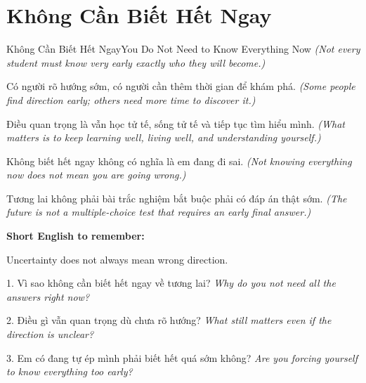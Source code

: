\section{Không Cần Biết Hết Ngay}
\begin{truyen}{Không Cần Biết Hết Ngay}{You Do Not Need to Know Everything Now}
\textit{(Not every student must know very early exactly who they will become.)}

Có người rõ hướng sớm, có người cần thêm thời gian để khám phá.
\textit{(Some people find direction early; others need more time to discover it.)}

Điều quan trọng là vẫn học tử tế, sống tử tế và tiếp tục tìm hiểu mình.
\textit{(What matters is to keep learning well, living well, and understanding yourself.)}

Không biết hết ngay không có nghĩa là em đang đi sai.
\textit{(Not knowing everything now does not mean you are going wrong.)}
\end{truyen}

\begin{baihoc}
Tương lai không phải bài trắc nghiệm bắt buộc phải có đáp án thật sớm.
\textit{(The future is not a multiple-choice test that requires an early final answer.)}
\end{baihoc}

\begin{ghinhoanh}
\textbf{Short English to remember:}

Uncertainty does not always mean wrong direction.

\end{ghinhoanh}

\begin{tuhocnhanh}
1. Vì sao không cần biết hết ngay về tương lai? \textit{Why do you not need all the answers right now?}

2. Điều gì vẫn quan trọng dù chưa rõ hướng? \textit{What still matters even if the direction is unclear?}

3. Em có đang tự ép mình phải biết hết quá sớm không? \textit{Are you forcing yourself to know everything too early?}
\end{tuhocnhanh}
\ngancach

